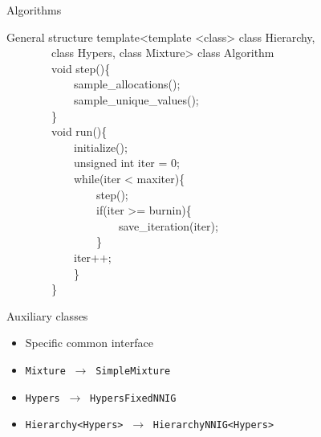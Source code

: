 \begin{frame}[c] %
	\begin{center}
		\huge \color{blue} Algorithms
	\end{center}
\end{frame}


\begin{frame}[fragile]{General structure} %
\small
\ttfamily
{}\selectfont
template<template <class> class Hierarchy, \\
\ \ \ \ \ \ \ \ class Hypers, class Mixture> class Algorithm \\[10pt]
\selectfont
\ \ \ \ \ \ \ \ void step()\{ \\
\ \ \ \ \ \ \ \ \ \ \ \ sample\_allocations(); \\
\ \ \ \ \ \ \ \ \ \ \ \ sample\_unique\_values(); \\
\ \ \ \ \ \ \ \ \} \\[10pt]
\selectfont
\ \ \ \ \ \ \ \ void run()\{ \\
\ \ \ \ \ \ \ \ \ \ \ \ initialize(); \\
\ \ \ \ \ \ \ \ \ \ \ \ unsigned int iter = 0; \\
\ \ \ \ \ \ \ \ \ \ \ \ while(iter < maxiter)\{ \\
\selectfont
\ \ \ \ \ \ \ \ \ \ \ \ \ \ \ \ step(); \\
\selectfont
\ \ \ \ \ \ \ \ \ \ \ \ \ \ \ \ if(iter >= burnin)\{ \\
\ \ \ \ \ \ \ \ \ \ \ \ \ \ \ \ \ \ \ \ save\_iteration(iter); \\
\ \ \ \ \ \ \ \ \ \ \ \ \ \ \ \ \} \\
\ \ \ \ \ \ \ \ \ \ \ \ iter++; \\
\ \ \ \ \ \ \ \ \ \ \ \ \} \\
\ \ \ \ \ \ \ \ \} \\

\end{frame}


\begin{frame}{Auxiliary classes} %
	\begin{itemize}
		\item Specific common interface
		\item \texttt{Mixture} $\ \to \ $ \texttt{SimpleMixture}
		\item \texttt{Hypers} $\ \to \ $ \texttt{HypersFixedNNIG}
		\item \texttt{Hierarchy<Hypers>} $\ \to \ $ \texttt{HierarchyNNIG<Hypers>}
	\end{itemize}
\end{frame}


